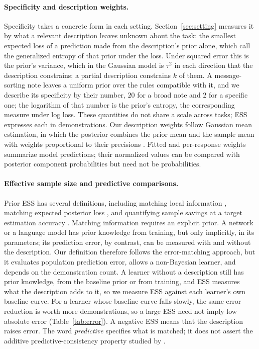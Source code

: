\documentclass{article}
\theoremstyle{definition}
\begin{document}
\paragraph{Specificity and description weights.}
Specificity takes a concrete form in each setting. Section~\ref{sec:setting} measures it by what a relevant description leaves unknown about the task: the smallest expected loss of a prediction made from the description's prior alone, which \citet{grunwald2004} call the generalized entropy of that prior under the loss. Under squared error this is the prior's variance, which in the Gaussian model is $\tau^2$ in each direction that the description constrains; a partial description constrains $k$ of them. A message-sorting note leaves a uniform prior over the rules compatible with it, and we describe its specificity by their number, $20$ for a broad note and $2$ for a specific one; the logarithm of that number is the prior's entropy, the corresponding measure under log loss. These quantities do not share a scale across tasks; ESS expresses each in demonstrations. Our description weights follow Gaussian mean estimation, in which the posterior combines the prior mean and the sample mean with weights proportional to their precisions \citep{neuenschwander2020}. Fitted and per-response weights summarize model predictions; their normalized values can be compared with posterior component probabilities but need not be probabilities.

\paragraph{Effective sample size and predictive comparisons.}
Prior ESS has several definitions, including matching local information \citep{morita2008}, matching expected posterior loss \citep{reimherr2021}, and quantifying sample savings at a target estimation accuracy \citep{wiesenfarth2020}. Matching information requires an explicit prior. A network or a language model has prior knowledge from training, but only implicitly, in its parameters; its prediction error, by contrast, can be measured with and without the description. Our definition therefore follows the error-matching approach, but it evaluates population prediction error, allows a non-Bayesian learner, and depends on the demonstration count. A learner without a description still has prior knowledge, from the baseline prior or from training, and ESS measures what the description adds to it, so we measure ESS against each learner's own baseline curve. For a learner whose baseline curve falls slowly, the same error reduction is worth more demonstrations, so a large ESS need not imply low absolute error (Table~\ref{tab:error}). A negative ESS means that the description raises error. The word \emph{predictive} specifies what is matched; it does not assert the additive predictive-consistency property studied by \citet{neuenschwander2020}.
\end{document}
